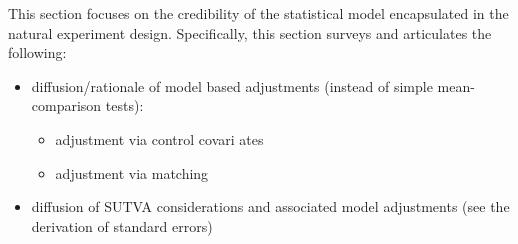 \noindent This section focuses on the credibility of the statistical model
encapsulated in the natural experiment design. Specifically, this section surveys and articulates the following:

\begin{itemize}
    \item diffusion/rationale of model based adjustments (instead of simple
        mean-comparison tests):
        \begin{itemize}
            \item adjustment via control covari ates
            \item adjustment via matching
        \end{itemize}
    \item diffusion of SUTVA considerations and associated model adjustments
        (see the derivation of standard errors)
\end{itemize}


%
%
%
%
%
%
%
%
%
%
%
%

